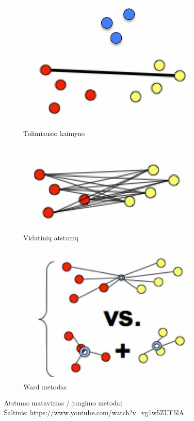 \documentclass{VUMIFInfBakalaurinis}
\begin{document}
\begin{itemize}
  \begin{figure}[!ht]
    \centering
    \begin{subfigure}[b]{.3\textwidth}
      \includegraphics[scale=1]{img/complete}
      \centering
      \caption{Tolimiausio kaimyno}
    \end{subfigure}
    \begin{subfigure}[b]{.3\textwidth}
      \includegraphics[scale=1]{img/average}
      \centering
      \caption{Vidutinių atstumų}
    \end{subfigure}
    \begin{subfigure}[b]{.3\textwidth}
      \includegraphics[scale=1]{img/ward}
      \centering
      \caption{Ward metodas}
    \end{subfigure}
    \caption{Atstumo matavimas / jungimo metodai\\
             Šaltinis: https://www.youtube.com/watch?v=vg1w5ZUF5lA}
  \end{figure}


\end{itemize}
\end{document}
